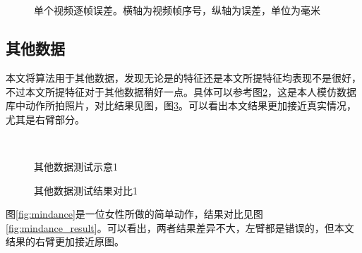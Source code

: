 \begin{figure}[htbp]
  \centering
  \\
  \\
  \caption[单个视频逐帧误差]{单个视频逐帧误差。横轴为视频帧序号，纵轴为误差，单位为毫米}\label{fig:error}
\end{figure}

\subsection{其他数据}
本文将算法用于其他数据，发现无论是\cite{bo2010twin}的特征还是本文所提特征均表现不是很好，不过本文所提特征对于其他数据稍好一点。具体可以参考图\ref{fig:me}，这是本人模仿数据库中动作所拍照片，对比结果见图，图\ref{fig:me_result}。可以看出本文结果更加接近真实情况，尤其是右臂部分。

\begin{figure}[htbp]
  \centering
  \hspace{.5cm}
  \hspace{.5cm}
  \\
  \hspace{.5cm}
  \hspace{.5cm}
  \caption{其他数据测试示意1}\label{fig:me}
\end{figure}

\begin{figure}[H]
  \centering
  \hspace{2cm}
  \caption{其他数据测试结果对比1}\label{fig:me_result}
\end{figure}

图\ref{fig:mindance}是一位女性所做的简单动作，结果对比见图\ref{fig:mindance_result}。可以看出，两者结果差异不大，左臂都是错误的，但本文结果的右臂更加接近原图。

